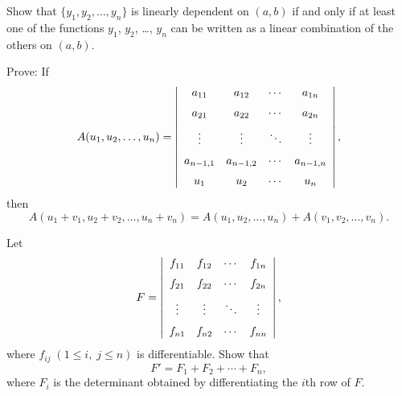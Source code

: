 \begin{exerciselist}
  \item\label{exer:9.1.16} Show that $\{y_{1},y_{2},\dots,y_{n}\}$ is linearly dependent on $(a,b)$
        if and only if at least one of the functions $y_{1}$, $y_{2}$, \dots, $y_{n}$ can be written
        as a linear combination of the others on $(a,b)$.

  \color{black}
  \rm

  \item\label{exer:9.1.17} Prove: If
  \[
    A(u_{1},u_{2},\dots,u_{n})= \left|
    \begin{array}{cccc}
      a_{11}    & a_{12}    & \cdots & a_{1n}    \\[2\jot]
      a_{21}    & a_{22}    & \cdots & a_{2n}    \\[2\jot]
      \vdots    & \vdots    & \ddots & \vdots    \\[2\jot]
      a_{n-1,1} & a_{n-1,2} & \cdots & a_{n-1,n} \\[2\jot]
      u_{1}     & u_{2}     & \cdots & u_{n}
    \end{array}\right|,
  \]
  then
  \[
    A(u_{1}+v_{1},u_{2}+v_{2},\dots, u_{n}+v_{n})=A(u_{1},u_{2},\dots,u_{n})+A(v_{1},v_{2},\dots, v_{n}).
  \]

  \item\label{exer:9.1.18} Let
  \[
    F=\left|
    \begin{array}{cccc}
      f_{11} & f_{12} & \cdots & f_{1n} \\[2\jot]
      f_{21} & f_{22} & \cdots & f_{2n} \\[2\jot]
      \vdots & \vdots & \ddots & \vdots \\[2\jot]
      f_{n1} & f_{n2} & \cdots & f_{nn}
    \end{array}\right|,
  \]
  where $f_{ij}\;(1\le i,\;j\le n)$ is differentiable. Show that
  \[
    F'=F_{1}+F_{2}+\cdots+F_{n},
  \]
  where $F_{i}$ is the determinant obtained by differentiating the $i$th row of $F$.


\end{exerciselist}
